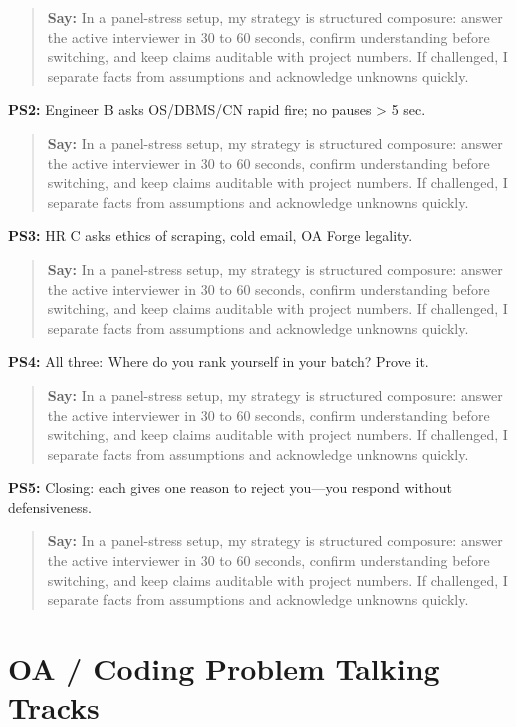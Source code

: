 \documentclass[9pt,a4paper]{article}
\begin{document}
\begin{quote}\small\textbf{Say:} In a panel-stress setup, my strategy is structured composure: answer the active interviewer in 30 to 60 seconds, confirm understanding before switching, and keep claims auditable with project numbers. If challenged, I separate facts from assumptions and acknowledge unknowns quickly.\end{quote}
\vspace{2mm}
\textbf{PS2:} Engineer B asks OS/DBMS/CN rapid fire; no pauses > 5 sec.

\begin{quote}\small\textbf{Say:} In a panel-stress setup, my strategy is structured composure: answer the active interviewer in 30 to 60 seconds, confirm understanding before switching, and keep claims auditable with project numbers. If challenged, I separate facts from assumptions and acknowledge unknowns quickly.\end{quote}
\vspace{2mm}
\textbf{PS3:} HR C asks ethics of scraping, cold email, OA Forge legality.

\begin{quote}\small\textbf{Say:} In a panel-stress setup, my strategy is structured composure: answer the active interviewer in 30 to 60 seconds, confirm understanding before switching, and keep claims auditable with project numbers. If challenged, I separate facts from assumptions and acknowledge unknowns quickly.\end{quote}
\vspace{2mm}
\textbf{PS4:} All three: Where do you rank yourself in your batch? Prove it.

\begin{quote}\small\textbf{Say:} In a panel-stress setup, my strategy is structured composure: answer the active interviewer in 30 to 60 seconds, confirm understanding before switching, and keep claims auditable with project numbers. If challenged, I separate facts from assumptions and acknowledge unknowns quickly.\end{quote}
\vspace{2mm}
\textbf{PS5:} Closing: each gives one reason to reject you---you respond without defensiveness.

\begin{quote}\small\textbf{Say:} In a panel-stress setup, my strategy is structured composure: answer the active interviewer in 30 to 60 seconds, confirm understanding before switching, and keep claims auditable with project numbers. If challenged, I separate facts from assumptions and acknowledge unknowns quickly.\end{quote}
\vspace{2mm}
\newpage\section{OA / Coding Problem Talking Tracks}
\end{document}
